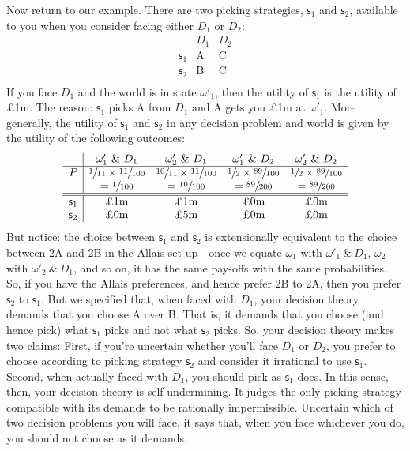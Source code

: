 \documentclass[a4paper]{article}
\newcommand\s{\mathsf{s}}
\newenvironment{CCM rewritten}
{\begingroup\color{blue}} %
{\endgroup}              %
\begin{document}
Now return to our example. There are two picking strategies, $\s_1$ and $\s_2$, available to you when you consider facing either $D_1$ or $D_2$:
$$
\begin{array}{r|cc}
& D_1 & D_2 \\
\hline
\s_1 & \text{A}& \text{C} \\
\s_2 & \text{B}& \text{C} \\
\end{array}
$$
If you face $D_1$ and the world is in state $\omega'_1$, then the utility of $\s_1$ is the utility of \pounds 1m. The reason: $\s_1$ picks A from $D_1$ and A gets you \pounds 1m at $\omega'_1$. More generally, the utility of $\s_1$ and $\s_2$ in any decision problem and world is given by the utility of the following outcomes:
$$
\begin{array}{r|cccc}
& \omega'_1\ \&\ D_1 &  \omega'_2\ \&\ D_1 &  \omega'_1\ \&\ D_2 &  \omega'_2\ \&\ D_2 \\
\hline
P &  \sfrac{1}{11} \times \sfrac{11}{100} & \sfrac{10}{11}\times\sfrac{11}{100} & \sfrac{1}{2}\times\sfrac{89}{100} & \sfrac{1}{2}\times\sfrac{89}{100} \\
& = \sfrac{1}{100} & = \sfrac{10}{100} & = \sfrac{89}{200} & = \sfrac{89}{200} \\
\hline
\hline
\s_1 & \text{\pounds 1m} & \text{\pounds 1m} & \text{\pounds 0m} & \text{\pounds 0m} \\
\s_2 & \text{\pounds 0m} & \text{\pounds 5m} & \text{\pounds 0m} & \text{\pounds 0m} \\
\end{array}
$$
But notice: the choice between $\s_1$ and $\s_2$ is extensionally equivalent to the choice between 2A and 2B in the Allais set up---once we equate $\omega_1$ with $\omega'_1\ \&\ D_1$, $\omega_2$ with $\omega'_2\ \&\ D_1$, and so on, it has the same pay-offs with the same probabilities. So, if you have the Allais preferences, and hence prefer 2B to 2A, then you prefer $\s_2$ to $\s_1$. But we specified that, when faced with $D_1$, your decision theory demands that you choose A over B. That is, it demands that you choose (and hence pick) what $\s_1$ picks and not what $\s_2$ picks. So, your decision theory makes two claims: First, if you're uncertain whether you'll face $D_1$ or $D_2$, you prefer to choose according to picking strategy $\s_2$ and consider it irrational to use $\s_1$. Second, when actually faced with $D_1$, you should pick as $\s_1$ does. In this sense, then, your decision theory is self-undermining. It judges the only picking strategy compatible with its demands to be {rationally impermissible}. Uncertain which of two decision problems you will face, it says that, when you face whichever you do, you should not choose as it demands.
\end{document}
